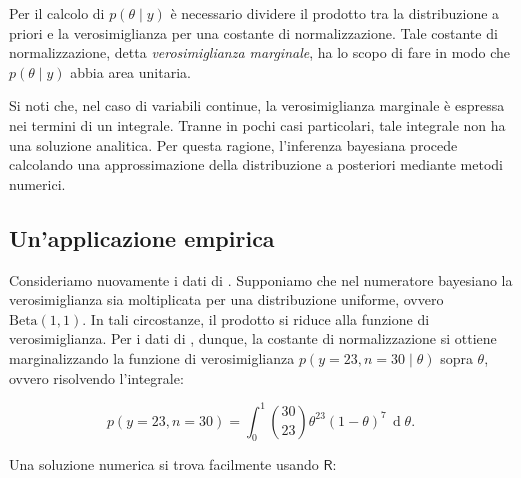 \documentclass[
]{book}
\newenvironment{Shaded}{\begin{snugshade}}{\end{snugshade}}
\newcommand{\AttributeTok}[1]{\textcolor[rgb]{0.77,0.63,0.00}{#1}}
\newcommand{\CommentTok}[1]{\textcolor[rgb]{0.56,0.35,0.01}{\textit{#1}}}
\newcommand{\ControlFlowTok}[1]{\textcolor[rgb]{0.13,0.29,0.53}{\textbf{#1}}}
\newcommand{\DecValTok}[1]{\textcolor[rgb]{0.00,0.00,0.81}{#1}}
\newcommand{\FunctionTok}[1]{\textcolor[rgb]{0.00,0.00,0.00}{#1}}
\newcommand{\NormalTok}[1]{#1}
\newcommand{\OtherTok}[1]{\textcolor[rgb]{0.56,0.35,0.01}{#1}}
\newcommand{\SpecialCharTok}[1]{\textcolor[rgb]{0.00,0.00,0.00}{#1}}
\newcommand{\R}{\textsf{R}} %
\theoremstyle{definition}
\theoremstyle{definition}
\theoremstyle{definition}
\theoremstyle{definition}
\theoremstyle{remark}
\begin{document}
Per il calcolo di \(p(\theta \mid y)\) è necessario dividere il prodotto tra la distribuzione a priori e la verosimiglianza per una costante di normalizzazione. Tale costante di normalizzazione, detta \emph{verosimiglianza marginale}, ha lo scopo di fare in modo che \(p(\theta \mid y)\) abbia area unitaria.

Si noti che, nel caso di variabili continue, la verosimiglianza marginale è espressa nei termini di un integrale. Tranne in pochi casi particolari, tale integrale non ha una soluzione analitica. Per questa ragione, l'inferenza bayesiana procede calcolando una approssimazione della distribuzione a posteriori mediante metodi numerici.

\hypertarget{unapplicazione-empirica-2}{%
\subsection{Un'applicazione empirica}\label{unapplicazione-empirica-2}}

Consideriamo nuovamente i dati di \citet{zetschefuture2019}. Supponiamo che nel numeratore bayesiano la verosimiglianza sia moltiplicata per una distribuzione uniforme, ovvero \(\mbox{Beta}(1, 1)\). In tali circostanze, il prodotto si riduce alla funzione di verosimiglianza. Per i dati di \citet{zetschefuture2019}, dunque, la costante di normalizzazione si ottiene marginalizzando la funzione di verosimiglianza \(p(y = 23, n = 30 \mid \theta)\) sopra \(\theta\), ovvero risolvendo l'integrale:

\begin{equation}
p(y = 23, n = 30) = \int_0^1 \binom{30}{23} \theta^{23} (1-\theta)^{7} \,\operatorname {d}\!\theta.
\label{eq:intlikebino23}
\end{equation}

Una soluzione numerica si trova facilmente usando \(\R\):

\begin{Shaded}
\end{Shaded}
\end{document}
